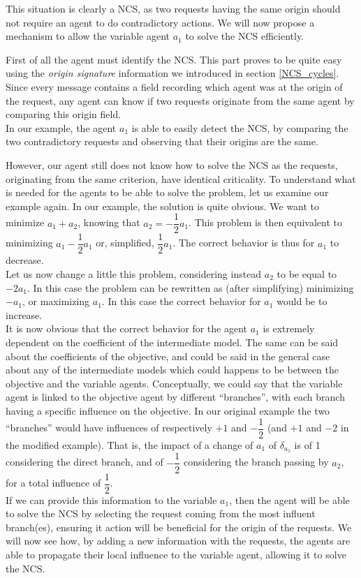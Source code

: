 This situation is clearly a NCS, as two requests having the same origin should not require an agent to do contradictory actions. We will now propose a mechanism to allow the variable agent $a_1$ to solve the NCS efficiently.

First of all the agent must identify the NCS. This part proves to be quite easy using the \emph{origin signature} information we introduced in section \ref{NCS_cycles}. Since every message contains a field recording which agent was at the origin of the request, any agent can know if two requests originate from the same agent by comparing this origin field.\\
In our example, the agent $a_1$ is able to easily detect the NCS, by comparing the two contradictory requests and observing that their origins are the same.

However, our agent still does not know how to solve the NCS as the requests, originating from the same criterion, have identical criticality. To understand what is needed for the agents to be able to solve the problem, let us examine our example again. In our example, the solution is quite obvious. We want to minimize $a_1 + a_2$, knowing that $a_2 = -\dfrac{1}{2}a_1$. This problem is then equivalent to minimizing $a_1-\dfrac{1}{2}a_1$ or, simplified, $\dfrac{1}{2}a_1$. The correct behavior is thus for $a_1$ to decrease.\\
Let us now change a little this problem, considering instead $a_2$ to be equal to $ -2a_1$. In this case the problem can be rewritten as (after simplifying) minimizing $-a_1$, or maximizing $a_1$. In this case the correct behavior for $a_1$ would be to increase.\\
It is now obvious that the correct behavior for the agent $a_1$ is extremely dependent on the coefficient of the intermediate model. The same can be said about the coefficients of the objective, and could be said in the general case about any of the intermediate models which could happens to be between the objective and the variable agents. Conceptually, we could say that the variable agent is linked to the objective agent by different \enquote{branches}, with each branch having a specific influence on the objective. In our original example the two \enquote{branches} would have influences of respectively $+1$ and $-\dfrac{1}{2}$ (and $+1$ and $-2$ in the modified example). That is, the impact of a change of $a_1$ of $\delta_{a_1}$ is of 1 considering the direct branch, and of $-\dfrac{1}{2}$ considering the branch passing by $a_2$, for a total influence of $\dfrac{1}{2}$.\\
If we can provide this information to the variable $a_1$, then the agent will be able to solve the NCS by selecting the request coming from the most influent branch(es), ensuring it action will be beneficial for the origin of the requests. We will now see how, by adding a new information with the requests, the agents are able to propagate their local influence to the variable agent, allowing it to solve the NCS.

